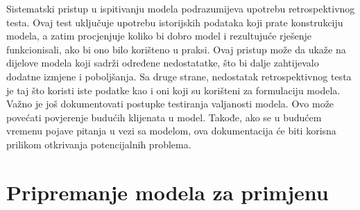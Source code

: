 \documentclass[b5paper, utf8, 11pt, colorlinks]{book}
\theoremstyle{definition}
\begin{document}
Sistematski pristup u ispitivanju modela podrazumijeva upotrebu retrospektivnog testa. Ovaj test uključuje upotrebu istorijskih podataka koji prate konstrukciju modela, a zatim procjenjuje koliko bi dobro  model i rezultujuće rješenje funkcionisali, ako bi ono  bilo korišteno u praksi.  Ovaj pristup može da ukaže na dijelove modela koji sadrži određene nedostatatke, što bi dalje zahtijevalo dodatne izmjene i poboljšanja. 
Sa druge strane, nedostatak retrospektivnog testa je taj što koristi iste podatke kao i oni koji su korišteni za formulaciju modela. %
Važno je još dokumentovati postupke testiranja valjanosti modela. Ovo može  povećati povjerenje budućih klijenata u model. Takođe, ako se u budućem vremenu pojave pitanja u vezi sa modelom, ova dokumentacija će  biti korisna prilikom otkrivanja potencijalnih problema. 

\section{Pripremanje modela za primjenu}
 
\end{document}
